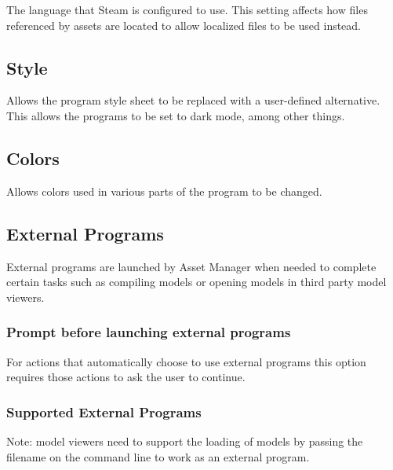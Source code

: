\documentclass[10pt, a4paper, titlepage, oneside]{article}
\begin{document}
The language that Steam is configured to use. This setting affects how files referenced by assets are located to allow localized files to be used instead.

\subsection{Style}

Allows the program style sheet to be replaced with a user-defined alternative. This allows the programs to be set to dark mode, among other things.

\subsection{Colors}

Allows colors used in various parts of the program to be changed.

\newpage

\subsection{External Programs}

External programs are launched by Asset Manager when needed to complete certain tasks such as compiling models or opening models in third party model viewers.

\subsubsection{Prompt before launching external programs}

For actions that automatically choose to use external programs this option requires those actions to ask the user to continue.

\subsubsection{Supported External Programs}
\label{sec:external_programs}

Note: model viewers need to support the loading of models by passing the filename on the command line to work as an external program.
\end{document}

